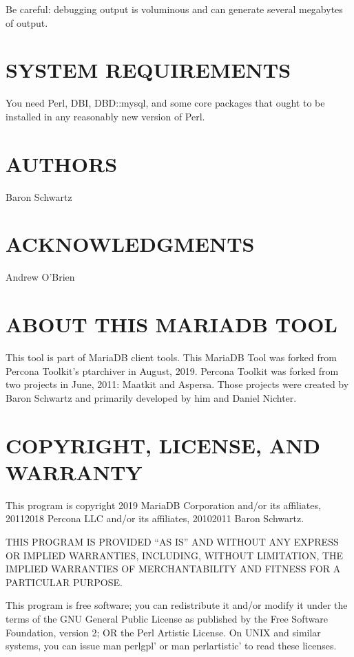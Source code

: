 \documentclass[letterpaper,10pt,english]{sphinxmanual}
\begin{document}
\sphinxAtStartPar
Be careful: debugging output is voluminous and can generate several megabytes
of output.


\section{SYSTEM REQUIREMENTS}
\label{\detokenize{mariadb-archiver:system-requirements}}
\sphinxAtStartPar
You need Perl, DBI, DBD::mysql, and some core packages that ought to be
installed in any reasonably new version of Perl.


\section{AUTHORS}
\label{\detokenize{mariadb-archiver:authors}}
\sphinxAtStartPar
Baron Schwartz


\section{ACKNOWLEDGMENTS}
\label{\detokenize{mariadb-archiver:acknowledgments}}
\sphinxAtStartPar
Andrew O’Brien


\section{ABOUT THIS MARIADB TOOL}
\label{\detokenize{mariadb-archiver:about-this-mariadb-tool}}
\sphinxAtStartPar
This tool is part of MariaDB client tools. This MariaDB Tool was forked from
Percona Toolkit’s pt\sphinxhyphen{}archiver in August, 2019. Percona Toolkit was forked from two
projects in June, 2011: Maatkit and Aspersa.  Those projects were created by
Baron Schwartz and primarily developed by him and Daniel Nichter.


\section{COPYRIGHT, LICENSE, AND WARRANTY}
\label{\detokenize{mariadb-archiver:copyright-license-and-warranty}}
\sphinxAtStartPar
This program is copyright 2019 MariaDB Corporation and/or its affiliates,
2011\sphinxhyphen{}2018 Percona LLC and/or its affiliates, 2010\sphinxhyphen{}2011 Baron Schwartz.

\sphinxAtStartPar
THIS PROGRAM IS PROVIDED “AS IS” AND WITHOUT ANY EXPRESS OR IMPLIED
WARRANTIES, INCLUDING, WITHOUT LIMITATION, THE IMPLIED WARRANTIES OF
MERCHANTABILITY AND FITNESS FOR A PARTICULAR PURPOSE.

\sphinxAtStartPar
This program is free software; you can redistribute it and/or modify it under
the terms of the GNU General Public License as published by the Free Software
Foundation, version 2; OR the Perl Artistic License.  On UNIX and similar
systems, you can issue \textasciigrave{}man perlgpl’ or \textasciigrave{}man perlartistic’ to read these
licenses.
\end{document}
